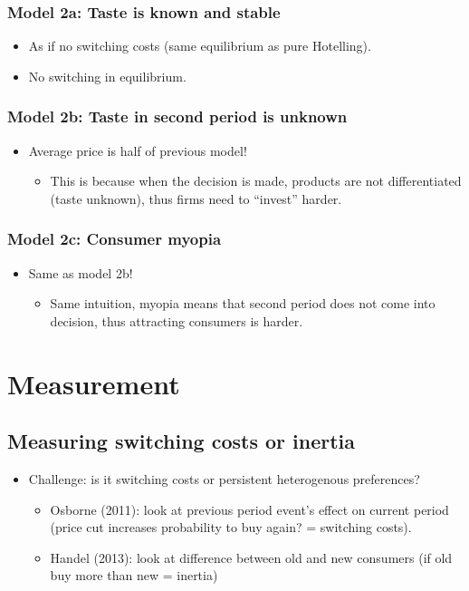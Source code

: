 \subsubsection{Model 2a: Taste is known and stable}

\begin{itemize}
\item As if no switching costs (same equilibrium as pure Hotelling).
\item No switching in equilibrium.
\end{itemize}

\subsubsection{Model 2b: Taste in second period is unknown}

\begin{itemize}
\item Average price is half of previous model!
\begin{itemize}
\item This is because when the decision is made, products are not differentiated (taste unknown), thus firms need to ``invest'' harder.
\end{itemize}
\end{itemize}

\subsubsection{Model 2c: Consumer myopia}

\begin{itemize}
\item Same as model 2b!
\begin{itemize}
\item Same intuition, myopia means that second period does not come into decision, thus attracting consumers is harder.
\end{itemize}
\end{itemize}

\section{Measurement}

\subsection{Measuring switching costs or inertia}

\begin{itemize}
\item Challenge: is it switching costs or persistent heterogenous preferences?
\begin{itemize}
\item Osborne (2011): look at previous period event's effect on current period (price cut increases probability to buy again? = switching costs).
\item Handel (2013): look at difference between old and new consumers (if old buy more than new = inertia)
\end{itemize}
\end{itemize}

